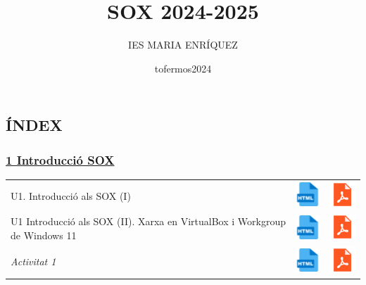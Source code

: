 \documentclass[
  12 pt,
  a4paper,
]{article}
\title{SOX 2024-2025}
\subtitle{IES MARIA ENRÍQUEZ}
\author{tofermos2024}
\date{}
\begin{document}
\maketitle

{
\setcounter{tocdepth}{2}
\tableofcontents
}
\subsection{ÍNDEX}\label{uxedndex}

\subsubsection{\texorpdfstring{\hyperref[U1]{1 Introducció
SOX}}{1 Introducció SOX}}\label{introducciuxf3-sox}

\begin{longtable}[]{@{}
  >{\raggedright\arraybackslash}p{}
  >{\raggedright\arraybackslash}p{}
  >{\raggedright\arraybackslash}p{}@{}}
\toprule\noalign{}
\endhead
\bottomrule\noalign{}
\endlastfoot
U1. Introducció als SOX (I) &
\href{U1_INTRODUCCIO_SOX/U1_INTRODUCCIO_SOX.html}{\includegraphics{recursos/iconohtml.png}}
&
\href{U1_INTRODUCCIO_SOX/U1_INTRODUCCIO_SOX.pdf}{\includegraphics{recursos/iconopdf.png}} \\
U1 Introducció als SOX (II). Xarxa en VirtualBox i Workgroup de Windows
11 &
\href{U1_WORKGROUP_VIRTUALBOX/U1_WORKGROUP_VIRTUALBOX.html}{\includegraphics{recursos/iconohtml.png}}
&
\href{U1_WORKGROUP_VIRTUALBOX/U1_WORKGROUP_VIRTUALBOX.pdf}{\includegraphics{recursos/iconopdf.png}} \\
\emph{Activitat 1} &
\href{U1_Activitat1/U1_Activitat1.html}{\includegraphics{recursos/iconohtml.png}}
&
\href{U1_Activitat1/U1_Activitat1.pdf}{\includegraphics{recursos/iconopdf.png}} \\
\end{longtable}
\end{document}
